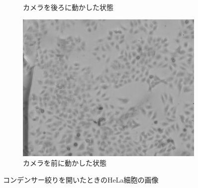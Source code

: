 \documentclass[titlepage]{jsarticle}
\begin{document}
\begin{figure}[htbp]
\begin{subfigure}{0.3\columnwidth}
        \caption{カメラを後ろに動かした状態}
        \label{fig:1_2_hela}
    \end{subfigure}
    \begin{subfigure}{0.3\columnwidth}
        \includegraphics[width=\columnwidth]{1_3_hela_forward.png}
        \caption{カメラを前に動かした状態}
        \label{fig:1_3_hela}
    \end{subfigure}
    \caption{コンデンサー絞りを開いたときのHeLa細胞の画像}
    \label{fig:1_hela}
\end{figure}
\end{document}
